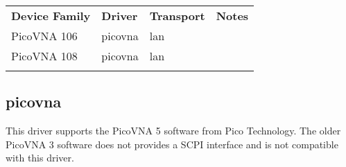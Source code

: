 \begin{tabularx}{16cm}{lllX}
\thickhline
\textbf{Device Family} & \textbf{Driver} & \textbf{Transport} & \textbf{Notes} \\
\thickhline
PicoVNA 106 & picovna & lan & \\
\thinhline
PicoVNA 108 & picovna & lan & \\
\thickhline
\end{tabularx}

\subsection{picovna}

This driver supports the PicoVNA 5 software from Pico Technology. The older PicoVNA 3 software does not provides a SCPI
interface and is not compatible with this driver.
